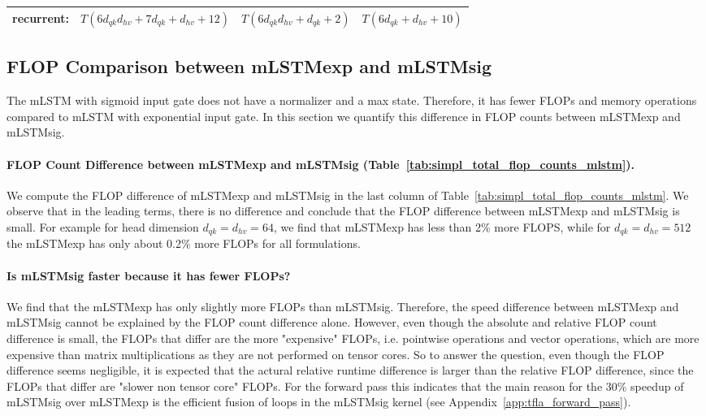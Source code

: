 \documentclass{article}
\begin{document}
\begin{table}[htbp]
\begin{adjustbox}{width=\textwidth}
\begin{tabular}{lcc|c}
                \midrule
                \textbf{recurrent:}          & $T \left(6 d_{qk} d_{hv} + 7 d_{qk} + d_{hv} + 12\right)$                                   & $T \left(6 d_{qk} d_{hv} + d_{qk} + 2\right)$ & $T \left(6 d_{qk} + d_{hv} + 10\right)$ \\
                \bottomrule
            \end{tabular}
        \end{adjustbox}
        \vspace{-0.2cm}
    \end{table}

    \subsection{FLOP Comparison between mLSTMexp and mLSTMsig}
    \label{app:flops_mlstmexp_vs_mlstmsig}


    The mLSTM with sigmoid input gate does not have a normalizer and a max state.
    Therefore, it has fewer FLOPs and memory operations compared to mLSTM with exponential input gate.
    In this section we quantify this difference in FLOP counts between mLSTMexp and mLSTMsig.

    \paragraph{FLOP Count Difference between mLSTMexp and mLSTMsig (Table~\ref{tab:simpl_total_flop_counts_mlstm}).}
    We compute the FLOP difference of mLSTMexp and mLSTMsig in the last column of Table~\ref{tab:simpl_total_flop_counts_mlstm}.
    We observe that in the leading terms, there is no difference and conclude that the FLOP difference between mLSTMexp and mLSTMsig is small.
    For example for head dimension $d_{qk} = d_{hv} = 64$, we find that mLSTMexp has less than 2\% more FLOPS, while for $d_{qk} = d_{hv} = 512$ the mLSTMexp has only about 0.2\% more FLOPs for all formulations.

    \paragraph{Is mLSTMsig faster because it has fewer FLOPs?} We find that the mLSTMexp has only slightly more FLOPs than mLSTMsig.
    Therefore, the speed difference between mLSTMexp and mLSTMsig cannot be explained by the FLOP count difference alone. However, even though the absolute and relative FLOP count difference is small, the FLOPs that differ are the more "expensive" FLOPs, i.e. pointwise operations and vector operations, which are more expensive than matrix multiplications as they are not performed on tensor cores.
    So to answer the question, even though the FLOP difference seems negligible, it is expected that the actural relative runtime difference is larger than the relative FLOP difference, since the FLOPs that differ are "slower non tensor core" FLOPs.
    For the forward pass this indicates that the main reason for the 30\% speedup of mLSTMsig over mLSTMexp is the efficient fusion of loops in the mLSTMsig kernel (see Appendix~\ref{app:tfla_forward_pass}).
\end{document}
